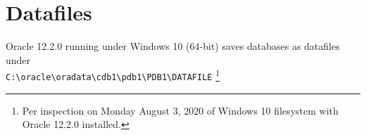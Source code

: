 
\newpage
\setcounter{secnumdepth}{0}
\section{Datafiles}

Oracle 12.2.0 running under Windows 10 (64-bit) saves databases as
datafiles under\\
 \texttt{C:\textbackslash oracle\textbackslash oradata\textbackslash cdb1\textbackslash pdb1\textbackslash PDB1\textbackslash DATAFILE}
\footnote{Per inspection on Monday August 3, 2020 of Windows 10 filesystem
with Oracle 12.2.0 installed.}
